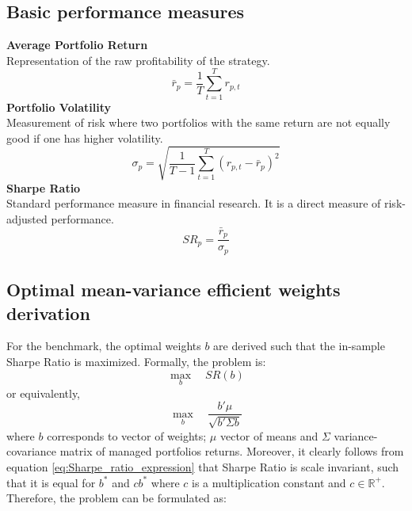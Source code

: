 \documentclass[11pt]{article}
\begin{document}
\subsection{Basic performance measures}
\textbf{Average Portfolio Return} \\
Representation of the raw profitability of the strategy. \\
\begin{equation}
\bar r_p = \frac{1}{T}\sum_{t=1}^{T} r_{p,t}
\end{equation}
\textbf{Portfolio Volatility} \\
Measurement of risk where two portfolios with the same return are not equally good if one has higher volatility. \\
\begin{equation}
\sigma_p =
\sqrt{
\frac{1}{T-1}
\sum_{t=1}^{T}
(r_{p,t}-\bar r_p)^2
}
\end{equation}
\textbf{Sharpe Ratio} \\
Standard performance measure in financial research. It is a direct measure of risk-adjusted performance. \\
\begin{equation}
SR_p = \frac{\bar r_p}{\sigma_p}
\end{equation}


\subsection{Optimal mean-variance efficient weights derivation}
\label{app:Optimal_MVE_weights}

For the \cite{moreira2017volatility} benchmark, the optimal weights $b$ are derived such that the in-sample Sharpe Ratio is maximized. Formally, the problem is:
\begin{equation}
    \max_{b} \quad SR(b)
\end{equation}
or equivalently, 
\begin{equation}
\label{eq:Sharpe_ratio_expression}
        \max_{b} \quad \frac{b'\mu}{\sqrt{b'\Sigma b}}
\end{equation}
where $b$ corresponds to vector of weights; $\mu$ vector of means and $\Sigma$ variance-covariance matrix of managed portfolios returns. Moreover, it clearly follows from equation \ref{eq:Sharpe_ratio_expression} that Sharpe Ratio is scale invariant, such that it is equal for $b^{*}$ and $cb^{*}$ where $c$ is a multiplication constant and $c \in \mathbb{R^{+}}$.
Therefore, the problem can be formulated as:
\end{document}
